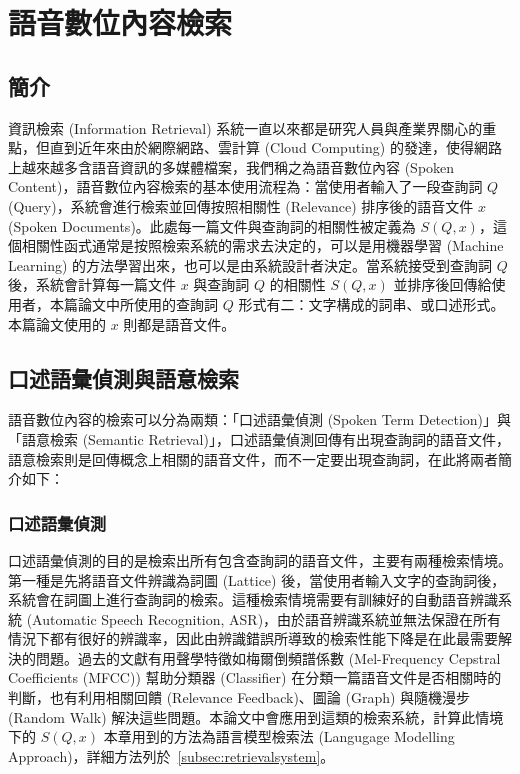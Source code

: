 \section{語音數位內容檢索}
    
\subsection{簡介}
資訊檢索 (Information Retrieval) 系統一直以來都是研究人員與產業界關心的重點，但直到近年來由於網際網路、雲計算 (Cloud Computing) 的發達，使得網路上越來越多含語音資訊的多媒體檔案，我們稱之為語音數位內容 (Spoken Content)，語音數位內容檢索的基本使用流程為：當使用者輸入了一段查詢詞 $Q$ (Query)，系統會進行檢索並回傳按照相關性 (Relevance) 排序後的語音文件 $x$ (Spoken Documents)。此處每一篇文件與查詢詞的相關性被定義為 $S(Q, x)$，這個相關性函式通常是按照檢索系統的需求去決定的，可以是用機器學習 (Machine Learning) 的方法學習出來，也可以是由系統設計者決定。當系統接受到查詢詞 $Q$ 後，系統會計算每一篇文件 $x$ 與查詢詞 $Q$ 的相關性 $S(Q, x)$ 並排序後回傳給使用者，本篇論文中所使用的查詢詞 $Q$ 形式有二：文字構成的詞串、或口述形式。本篇論文使用的 $x$ 則都是語音文件。

\subsection{口述語彙偵測與語意檢索}
語音數位內容的檢索可以分為兩類：「口述語彙偵測 (Spoken Term Detection)」與「語意檢索 (Semantic Retrieval)」，口述語彙偵測回傳有出現查詢詞的語音文件，語意檢索則是回傳概念上相關的語音文件，而不一定要出現查詢詞，在此將兩者簡介如下： 

\subsubsection{口述語彙偵測}
口述語彙偵測的目的是檢索出所有包含查詢詞的語音文件，主要有兩種檢索情境。第一種是先將語音文件辨識為詞圖 (Lattice) 後，當使用者輸入文字的查詢詞後，系統會在詞圖上進行查詢詞的檢索。這種檢索情境需要有訓練好的自動語音辨識系統 (Automatic Speech Recognition, ASR)，由於語音辨識系統並無法保證在所有情況下都有很好的辨識率，因此由辨識錯誤所導致的檢索性能下降是在此最需要解決的問題。過去的文獻有用聲學特徵如梅爾倒頻譜係數 (Mel-Frequency Cepstral Coefficients (MFCC)) 幫助分類器 (Classifier) 在分類一篇語音文件是否相關時的判斷，也有利用相關回饋 (Relevance Feedback)、圖論 (Graph) 與隨機漫步 (Random Walk) 解決這些問題。本論文中會應用到這類的檢索系統，計算此情境下的 $S(Q, x)$ 本章用到的方法為語言模型檢索法 (Langugage Modelling Approach)，詳細方法列於~\ref{subsec:retrievalsystem}。

